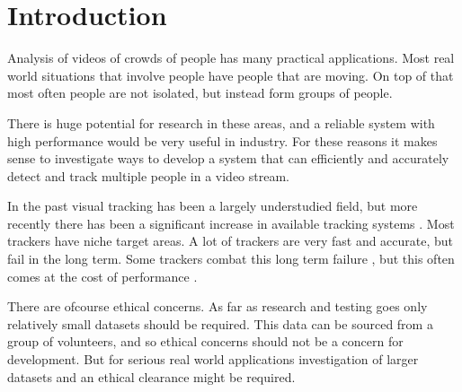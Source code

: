 \section{Introduction}
  Analysis of videos of crowds of people has many practical applications.
  Most real world situations that involve people have people that are moving.
  On top of that most often people are not isolated, but instead form groups of people.

  There is huge potential for research in these areas, and a reliable system with high performance would be very useful in industry.
  For these reasons it makes sense to investigate ways to develop a system that can efficiently and accurately detect and track multiple people in a video stream.

  In the past visual tracking has been a largely understudied field, but more recently there has been a significant increase in available tracking systems \cite{VOT2017}.
  Most trackers have niche target areas.
  A lot of trackers are very fast and accurate, but fail in the long term.
  Some trackers combat this long term failure \cite{Kalal2011}, but this often comes at the cost of performance \cite{Enriques2014} \cite{VOT2017}.

  There are ofcourse ethical concerns.
  As far as research and testing goes only relatively small datasets should be required.
  This data can be sourced from a group of volunteers, and so ethical concerns should not be a concern for development.
  But for serious real world applications investigation of larger datasets and an ethical clearance might be required.
